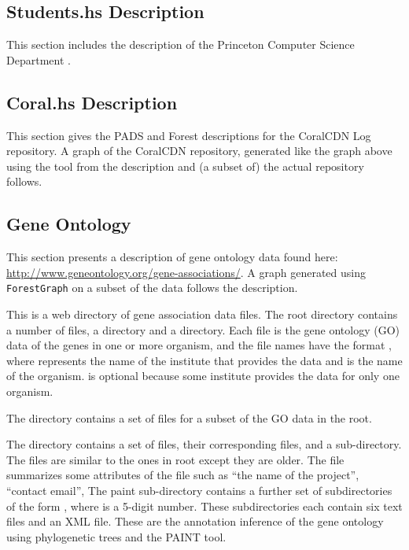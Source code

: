 \subsection{Students.hs Description}
This section includes the \forest{} description of the Princeton
Computer Science Department \filestore{}.


\newpage

\subsection{Coral.hs Description}

This section gives the PADS and Forest descriptions for the CoralCDN
Log repository. A graph of the CoralCDN
repository, generated like the graph above using the 
tool from the description and (a subset of) the actual repository 
follows.



\newpage

\subsection{Gene Ontology}

This section presents a description of gene ontology data found 
here: \url{http://www.geneontology.org/gene-associations/}.
A graph generated using \texttt{ForestGraph}
on a subset of the data follows the description.

This \filestore{} is a web directory of gene association data files.
The root directory contains a number of  files,
a  directory and a  directory.
Each  file is the gene ontology (GO) data of the genes
in one or more organism, and the file names have the format
, where  represents the
name of the institute that provides the data and  is the
name of the organism.  is optional because some institute
provides the data for only one organism.

The  directory contains a set of  files for a
subset of the GO data in the root.

The  directory contains a set of  files, their
corresponding  files, and a  sub-directory.
The  files are similar to the ones
in root except they are older. The  file summarizes
some attributes of the  file such as ``the name of the project'',
``contact email'', \etc{} The paint sub-directory contains
a further set of subdirectories of the form , where
 is a 5-digit number. These subdirectories each contain
six text files and an XML file. These are the annotation inference
of the gene ontology using phylogenetic trees and the PAINT tool.


